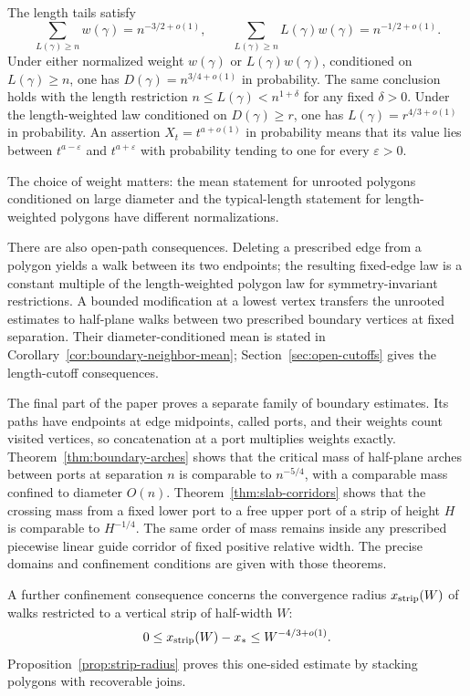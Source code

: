 \begin{corollary}\label{cor:length-cutoffs}
The length tails satisfy
\[
 \sum_{L(\gamma)\ge n}w(\gamma)=n^{-3/2+o(1)},\qquad
 \sum_{L(\gamma)\ge n}L(\gamma)w(\gamma)=n^{-1/2+o(1)}.
\]
Under either normalized weight $w(\gamma)$ or $L(\gamma)w(\gamma)$,
conditioned on $L(\gamma)\ge n$, one has
$D(\gamma)=n^{3/4+o(1)}$ in probability.  The same conclusion holds
with the length restriction $n\le L(\gamma)<n^{1+\delta}$ for any
fixed $\delta>0$.  Under the length-weighted law conditioned on
$D(\gamma)\ge r$, one has $L(\gamma)=r^{4/3+o(1)}$ in probability.
An assertion $X_t=t^{a+o(1)}$ in probability means that its value lies
between $t^{a-\varepsilon}$ and $t^{a+\varepsilon}$ with probability
tending to one for every $\varepsilon>0$.
\end{corollary}

The choice of weight matters: the mean statement for unrooted polygons
conditioned on large diameter and the typical-length statement for
length-weighted polygons have different normalizations.

There are also open-path consequences.  Deleting a prescribed edge from a
polygon yields a walk between its two endpoints; the resulting fixed-edge
law is a constant multiple of the length-weighted polygon law for
symmetry-invariant restrictions. A bounded modification at a lowest
vertex transfers the unrooted estimates to half-plane walks between two
prescribed boundary vertices at fixed separation. Their diameter-conditioned
mean is stated in Corollary~\ref{cor:boundary-neighbor-mean};
Section~\ref{sec:open-cutoffs} gives the length-cutoff consequences.

The final part of the paper proves a separate family of boundary
estimates. Its paths have endpoints at edge midpoints, called ports,
and their weights count visited vertices, so concatenation at a port
multiplies weights exactly. Theorem~\ref{thm:boundary-arches} shows that
the critical mass of half-plane arches between ports at separation $n$
is comparable to $n^{-5/4}$, with a comparable mass confined to diameter
$O(n)$. Theorem~\ref{thm:slab-corridors} shows that the crossing mass
from a fixed lower port to a free upper port of a strip of height $H$
is comparable to $H^{-1/4}$. The same order of mass remains inside any
prescribed piecewise linear guide corridor of fixed positive relative
width. The precise domains and confinement conditions are given with
those theorems.

A further confinement consequence concerns the convergence radius $x_{\rm strip}(W)$ of walks restricted to a vertical strip of half-width $W$:
\[
 0\le x_{\rm strip}(W)-x_*\le W^{-4/3+o(1)}.
\]
Proposition~\ref{prop:strip-radius} proves this one-sided estimate by stacking polygons with recoverable joins.

